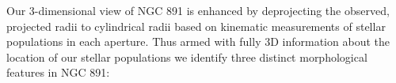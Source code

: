 

Our 3-dimensional view of NGC 891 is enhanced by deprojecting the
observed, projected radii to cylindrical radii based on kinematic
measurements of stellar populations in each aperture. Thus armed with
fully 3D information about the location of our stellar populations we
identify three distinct morphological features in NGC 891:


